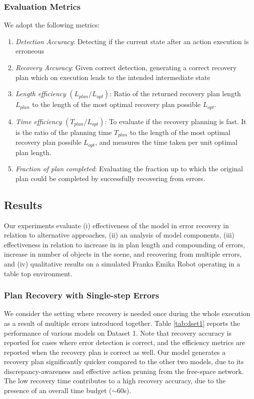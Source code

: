 \subsubsection{Evaluation Metrics} 
We adopt the following metrics:
\begin{enumerate}
    \item \textit{Detection Accuracy}: Detecting if the current state after an action execution is erroneous 
    \item \textit{Recovery Accuracy}: Given correct detection, generating a correct recovery plan which on execution leads to the intended intermediate state
    \item \textit{Length efficiency $(L_{plan}/L_{opt})$}: Ratio of the returned recovery plan length $L_{plan}$ to the length of the most optimal recovery plan possible $L_{opt}$.
    \item \textit{Time efficiency $(T_{plan}/L_{opt})$}: To evaluate if the recovery planning is fast. It is the ratio of the planning time $T_{plan}$ to the length of the most optimal recovery plan possible $L_{opt}$, and measures the time taken per unit optimal plan length.
    \item \textit{Fraction of plan completed}: Evaluating the fraction up to which the original plan could be completed by successfully recovering from errors.
\end{enumerate}

\subsection{Results}\label{sec:results}
Our experiments evaluate (i) effectiveness of the model in error recovery in relation to alternative approaches, (ii) an analysis of model components, (iii) effectiveness in relation to increase in in plan length and compounding of errors, increase in number of objects in the scene, and recovering from multiple errors, 
and (iv) qualitative results on a simulated Franka Emika Robot operating in a table top environment. 

\subsubsection{Plan Recovery with Single-step Errors} 
We consider the setting where recovery is needed once during the whole execution as a result of multiple errors introduced together. Table \ref{tab:dset1} reports the performance of various models on Dataset 1. Note that recovery accuracy is reported for cases where error detection is correct, and the efficiency metrics are reported when the recovery plan is correct as well. Our model generates a recovery plan significantly quicker compared to the other two models, due to its discrepancy-awareness and effective action pruning from the free-space network. The low recovery time contributes to a high recovery accuracy, due to the presence of an overall time budget ($\sim$60s).

